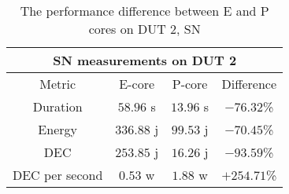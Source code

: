 \begin{table}[H]
    \centering
    \begin{tabular}{|| c | c | c | c ||}
    \hline
    \multicolumn{4}{||c||}{SN measurements on DUT 2} \\ [0.5ex] \hline\hline
    Metric & E-core & P-core & Difference \\\hline
    Duration & $58.96$ s & $13.96$ s & $-76.32$\% \\
    Energy & $336.88$ j & $99.53$ j & $-70.45$\% \\
    DEC & $253.85$ j & $16.26$ j & $-93.59$\% \\
    DEC per second & $0.53$ w & $1.88$ w & $+254.71$\% \\\hline
    \end{tabular}
    \caption{The performance difference between E and P cores on DUT 2, SN}
    \label{tab:dut-2-exp-3-sn}
\end{table}












